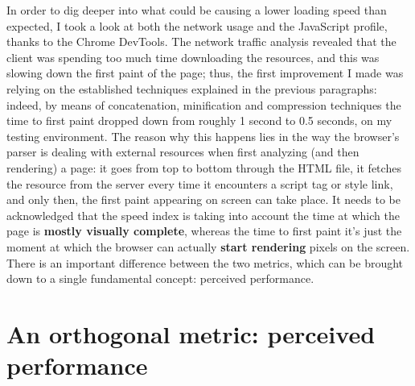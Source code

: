 \documentclass[12pt,oneside,svgnames]{memoir}
\begin{document}
In order to dig deeper into what could be causing a lower loading speed
than expected, I took a look at both the network usage and the
JavaScript profile, thanks to the Chrome DevTools. The network traffic
analysis revealed that the client was spending too much time downloading
the resources, and this was slowing down the first paint of the page;
thus, the first improvement I made was relying on the established
techniques explained in the previous paragraphs: indeed, by means of
concatenation, minification and compression techniques the time to first
paint dropped down from roughly 1 second to 0.5 seconds, on my testing
environment. The reason why this happens lies in the way the browser's
parser is dealing with external resources when first analyzing (and then
rendering) a page: it goes from top to bottom through the HTML file, it
fetches the resource from the server every time it encounters a script
tag or style link, and only then, the first paint appearing on screen
can take place. It needs to be acknowledged that the speed index is
taking into account the time at which the page is \textbf{mostly
visually complete}, whereas the time to first paint it's just the moment
at which the browser can actually \textbf{start rendering} pixels on the
screen. There is an important difference between the two metrics, which
can be brought down to a single fundamental concept: perceived
performance.

\section{An orthogonal metric: perceived
performance}\label{an-orthogonal-metric-perceived-performance}
\end{document}
